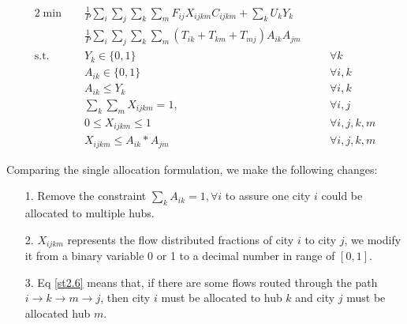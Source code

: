 \documentclass{llncs}
\begin{document}
	\begin{alignat}{2}
	\min\quad
	& \frac{1}{P} \sum_{i}\sum_{j}\sum_{k}\sum_{m}F_{ij}  X_{ijkm} C_{ijkm} + \sum_{k}U_k Y_{k} & & \nonumber\\
	\quad& \frac{1}{P} \sum_{i}\sum_{j}\sum_{k}\sum_{m}{(T_{ik}+ T_{km}+ T_{mj} ) A_{ik} A_{jm}}  & & \tag{LP3} \label{lp3}\\
	\mbox{s.t.}  \quad
	&Y_{k} \in \{0,1\} &\quad& \forall k \label{st2.1}\\ 
	&A_{ik} \in \{0,1\} &\quad& \forall i,k \label{st2.2}\\ 
	&A_{ik} \leq Y_{k} &\quad& \forall i,k \label{st2.3}\\
	&\sum_{k}\sum_{m}{X_{ijkm} = 1}, &\quad& \forall i,j \label{st2.4}\\
	& 0 \leq X_{ijkm} \leq 1 &\quad& \forall i,j,k,m \label{st2.5}\\
	&X_{ijkm} \leq A_{ik} * A_{jm} &\quad& \forall i,j,k,m \label{st2.6}
	\end{alignat}
	
	
	Comparing the single allocation formulation, we make the following changes: 
	\begin{itemize}
		\item[1.] Remove the constraint $\sum_{k}{A_{ik}} = 1, \forall i$ to assure one city $i$ could be allocated to multiple hubs.
		\item[2.] $X_{ijkm}$ represents the flow distributed fractions of city $i$ to city $j$, we modify it from a binary variable 0 or 1 to a decimal number in range of $[0,1]$.
		\item[3.] Eq \ref{st2.6} means that, if there are some flows routed through the path $i\rightarrow k \rightarrow m \rightarrow j$, then city $i$ must be allocated to hub $k$ and city $j$ must be allocated hub $m$.
	\end{itemize}
\end{document}
